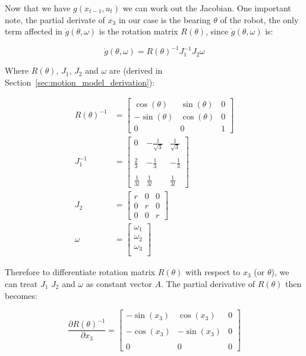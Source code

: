 \documentclass{article}
\begin{document}
Now that we have $g(x_{t-1}, u_{t})$ we can work out the Jacobian. One 
important note, the partial derivate of $x_{3}$ in our case is the bearing  
$\theta$ of the robot, the only term affected in $\dot{g}(\theta, \omega)$ is 
the rotation matrix $R(\theta)$, since $\dot{g}(\theta, \omega)$ is:

\begin{equation}
    \dot{g}(\theta, \omega) = R(\theta)^{-1} J_{1}^{-1} J_{2} \omega
\end{equation}


Where $R(\theta)$, $J_{1}$, $J_{2}$ and $\omega$ are (derived in 
Section~\ref{sec:motion_model_derivation}): 

\begin{align}
	R(\theta)^{-1} &= 
 	\begin{bmatrix}
	    \cos{(\theta)} & \sin{(\theta)} & 0 \\
	    -\sin{(\theta)} & \cos{(\theta)} & 0 \\
	    0 & 0 & 1
    \end{bmatrix} \\
	J_{1}^{-1} &= 
	\begin{bmatrix}
		0 & -\frac{1}{\sqrt{3}} & \frac{1}{\sqrt{3}} \\ \\
		\frac{2}{3} & -\frac{1}{3} & -\frac{1}{3} \\ \\
		\frac{1}{3l} & \frac{1}{3l} & \frac{1}{3l}
	\end{bmatrix} \\
    J_{2} &=
    \begin{bmatrix}
        r & 0 & 0 \\
        0 & r & 0 \\
        0 & 0 & r
    \end{bmatrix} \\
    \omega &= 
	    \begin{bmatrix}
	       \omega_{1} \\
	       \omega_{2} \\
	       \omega_{3} \\
	    \end{bmatrix}
\end{align}

Therefore to differentiate rotation matrix $R(\theta)$ with respect to $x_{3}$ 
(or $\theta$), we can treat $J_{1}$ $J_{2}$ and $\omega$ as constant vector 
$A$. The partial derivative of $R(\theta)$ then becomes:

\begin{equation}
	\dfrac{\partial R(\theta)^{-1}}{\partial x_{3}} = 
	\begin{bmatrix}
		-\sin(x_{3}) & \cos(x_{3}) & 0 \\ \\
		-\cos(x_{3}) & -\sin(x_{3}) & 0 \\ \\
		0 & 0 & 0
	\end{bmatrix}
\end{equation}
\end{document}
